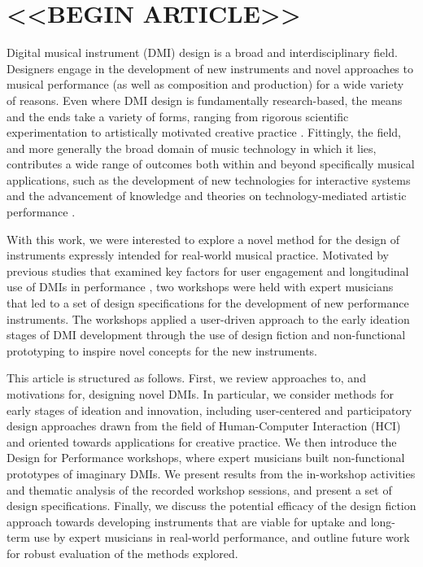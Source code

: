 \documentclass[letterpaper, 12pt]{article}
\begin{document}
\section{<<BEGIN ARTICLE>>}


Digital musical instrument (DMI) design is a broad and interdisciplinary field. Designers engage in the development of new instruments and novel approaches to musical performance (as well as composition and production) for a wide variety of reasons. Even where DMI design is fundamentally research-based, the means and the ends take a variety of forms, ranging from rigorous scientific experimentation to artistically motivated creative practice \citep{Gurevich2016}. Fittingly, the field, and more generally the broad domain of music technology in which it lies, contributes a wide range of outcomes both within and beyond specifically musical applications, such as the development of new technologies for interactive systems \citep{malloch2018generalized} and the advancement of knowledge and theories on technology-mediated artistic performance \citep{Tahlroglu2020}. 

With this work, we were interested to explore a novel method for the design of instruments expressly intended for real-world musical practice. Motivated by previous studies that examined key factors for user engagement \citep{OBrien2008} and longitudinal use of DMIs in performance \citep{Sullivan2019,Wallis2013}, two workshops were held with expert musicians that led to a set of design specifications for the development of new performance instruments. The workshops applied a user-driven approach to the early ideation stages of DMI development through the use of design fiction \citep{Blythe2014} and non-functional prototyping \citep{Pigrem2018} to inspire novel concepts for the new instruments. 

This article is structured as follows. First, we review approaches to, and motivations for, designing novel DMIs. In particular, we consider methods for early stages of ideation and innovation, including user-centered and participatory design approaches drawn from the field of Human-Computer Interaction (HCI) and oriented towards applications for creative practice. We then introduce the Design for Performance workshops, where expert musicians built non-functional prototypes of imaginary DMIs. We present results from the in-workshop activities and thematic analysis of the recorded workshop sessions, and present a set of design specifications. Finally, we discuss the potential efficacy of the design fiction approach towards developing instruments that are viable for uptake and long-term use by expert musicians in real-world performance, and outline future work for robust evaluation of the methods explored.
\end{document}
